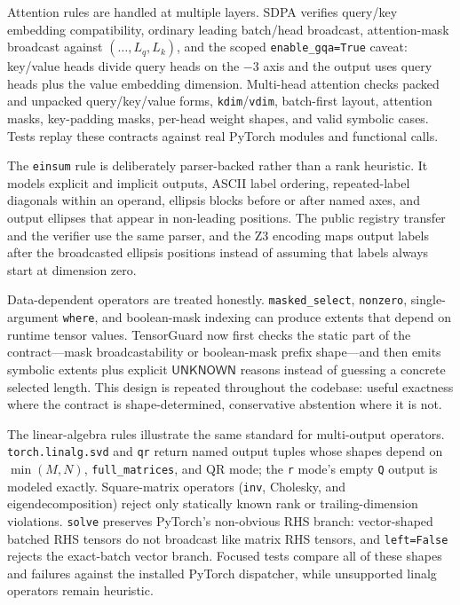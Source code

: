 \documentclass[11pt]{article}
\newcommand{\tg}{TensorGuard}
\newcommand{\unknown}{\ensuremath{\mathsf{UNKNOWN}}}
\begin{document}
Attention rules are handled at multiple layers.  SDPA verifies query/key
embedding compatibility, ordinary leading batch/head broadcast, attention-mask
broadcast against \((\ldots,L_q,L_k)\), and the scoped
\texttt{enable\_gqa=True} caveat: key/value heads divide query heads on the
\(-3\) axis and the output uses query heads plus the value embedding dimension.
Multi-head attention checks packed and unpacked query/key/value forms,
\texttt{kdim}/\texttt{vdim}, batch-first layout, attention masks, key-padding
masks, per-head weight shapes, and valid symbolic cases.  Tests replay these
contracts against real PyTorch modules and functional calls.

The \texttt{einsum} rule is deliberately parser-backed rather than a rank
heuristic.  It models explicit and implicit outputs, ASCII label ordering,
repeated-label diagonals within an operand, ellipsis blocks before or after named
axes, and output ellipses that appear in non-leading positions.  The public
registry transfer and the verifier use the same parser, and the Z3 encoding
maps output labels after the broadcasted ellipsis positions instead of assuming
that labels always start at dimension zero.

Data-dependent operators are treated honestly.  \texttt{masked\_select},
\texttt{nonzero}, single-argument \texttt{where}, and boolean-mask indexing can
produce extents that depend on runtime tensor values.  \tg{} now first checks
the static part of the contract---mask broadcastability or boolean-mask prefix
shape---and then emits symbolic extents plus explicit \unknown{} reasons instead
of guessing a concrete selected length.  This design is repeated throughout the
codebase: useful exactness where the contract is shape-determined, conservative
abstention where it is not.

The linear-algebra rules illustrate the same standard for multi-output operators.
\texttt{torch.linalg.svd} and \texttt{qr} return named output tuples whose shapes
depend on \(\min(M,N)\), \texttt{full\_matrices}, and QR mode; the \texttt{r}
mode's empty \texttt{Q} output is modeled exactly.  Square-matrix operators
(\texttt{inv}, Cholesky, and eigendecomposition) reject only statically known
rank or trailing-dimension violations.  \texttt{solve} preserves PyTorch's
non-obvious RHS branch: vector-shaped batched RHS tensors do not broadcast like
matrix RHS tensors, and \texttt{left=False} rejects the exact-batch vector branch.
Focused tests compare all of these shapes and failures against the installed
PyTorch dispatcher, while unsupported linalg operators remain heuristic.
\end{document}
